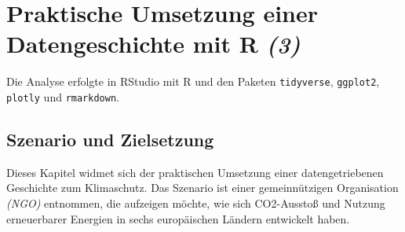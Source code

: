 

\section{Praktische Umsetzung einer Datengeschichte mit R \textit{(3)}}

Die Analyse erfolgte in RStudio mit R und den Paketen \texttt{tidyverse}, \texttt{ggplot2}, \texttt{plotly} und \texttt{rmarkdown}.

\begin{minipage}[t]{0.48\textwidth}
    
\end{minipage}
\hfill
\begin{minipage}[t]{0.48\textwidth}
    
\end{minipage}%
\vspace{-2\baselineskip}%
\captionsetup{hypcap=false}%
%
\label{lst:installation}%

\subsection{Szenario und Zielsetzung}
\label{sec:3-einleitung}

Dieses Kapitel widmet sich der praktischen Umsetzung einer datengetriebenen Geschichte zum Klimaschutz. Das Szenario ist einer gemeinnützigen Organisation \textit{(\acs{NGO})} entnommen, die aufzeigen möchte, wie sich \acs{CO2}-Ausstoß und Nutzung erneuerbarer Energien in sechs europäischen Ländern entwickelt haben.

